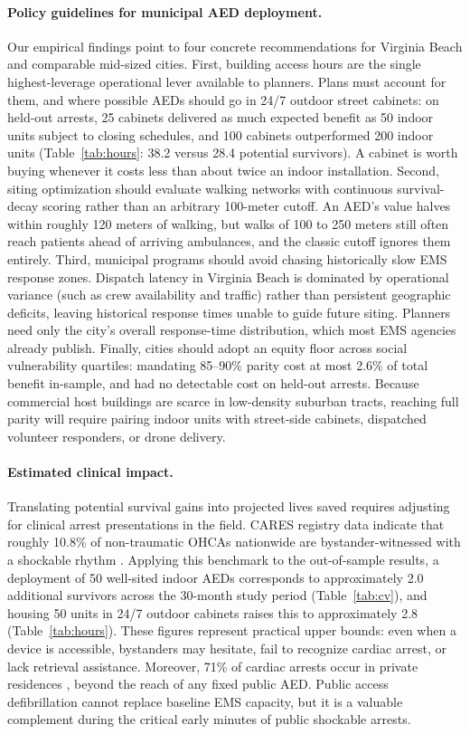 \documentclass[11pt]{article}
\begin{document}
\paragraph{Policy guidelines for municipal AED deployment.}
Our empirical findings point to four concrete recommendations for Virginia Beach and comparable mid-sized cities.
First, building access hours are the single highest-leverage operational lever available to planners. Plans must account for them, and where possible AEDs should go in 24/7 outdoor street cabinets: on held-out arrests, 25 cabinets delivered as much expected benefit as 50 indoor units subject to closing schedules, and 100 cabinets outperformed 200 indoor units (Table~\ref{tab:hours}: 38.2 versus 28.4 potential survivors). A cabinet is worth buying whenever it costs less than about twice an indoor installation.
Second, siting optimization should evaluate walking networks with continuous survival-decay scoring rather than an arbitrary 100-meter cutoff. An AED's value halves within roughly 120 meters of walking, but walks of 100 to 250 meters still often reach patients ahead of arriving ambulances, and the classic cutoff ignores them entirely.
Third, municipal programs should avoid chasing historically slow EMS response zones. Dispatch latency in Virginia Beach is dominated by operational variance (such as crew availability and traffic) rather than persistent geographic deficits, leaving historical response times unable to guide future siting. Planners need only the city's overall response-time distribution, which most EMS agencies already publish.
Finally, cities should adopt an equity floor across social vulnerability quartiles: mandating 85--90\% parity cost at most 2.6\% of total benefit in-sample, and had no detectable cost on held-out arrests. Because commercial host buildings are scarce in low-density suburban tracts, reaching full parity will require pairing indoor units with street-side cabinets, dispatched volunteer responders, or drone delivery.

\paragraph{Estimated clinical impact.}
Translating potential survival gains into projected lives saved requires adjusting for clinical arrest presentations in the field. CARES registry data indicate that roughly 10.8\% of non-traumatic OHCAs nationwide are bystander-witnessed with a shockable rhythm \cite{caresall}. Applying this benchmark to the out-of-sample results, a deployment of 50 well-sited indoor AEDs corresponds to approximately 2.0 additional survivors across the 30-month study period (Table~\ref{tab:cv}), and housing 50 units in 24/7 outdoor cabinets raises this to approximately 2.8 (Table~\ref{tab:hours}). These figures represent practical upper bounds: even when a device is accessible, bystanders may hesitate, fail to recognize cardiac arrest, or lack retrieval assistance. Moreover, 71\% of cardiac arrests occur in private residences \cite{caresall}, beyond the reach of any fixed public AED. Public access defibrillation cannot replace baseline EMS capacity, but it is a valuable complement during the critical early minutes of public shockable arrests.
\end{document}
